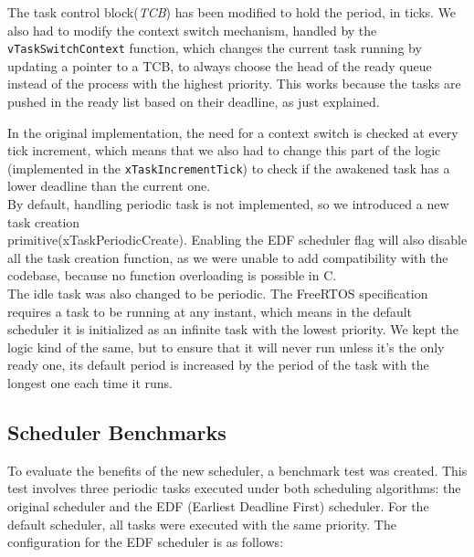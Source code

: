 \documentclass{article}
\begin{document}
The task control block(\textit{TCB}) has been modified to hold the period, in ticks.
We also had to modify the context switch mechanism, handled by the \texttt{vTaskSwitchContext} function, which changes the current task running by updating a pointer to a TCB, to always choose the head of the ready queue instead of the process with the highest priority. This works because the tasks are pushed in the ready list based on their deadline, as just explained.

In the original implementation, the need for a context switch is checked at every tick increment, which means that we also had to change this part of the logic (implemented in the \texttt{xTaskIncrementTick}) to check if the awakened task has a lower deadline than the current one.\\

By default, handling periodic task is not implemented, so we introduced a new task creation \\primitive(xTaskPeriodicCreate). Enabling the EDF scheduler flag will also disable all the task creation function, as we were unable to add compatibility with the codebase, because no function overloading is possible in C.\\

The idle task was also changed to be periodic. The FreeRTOS specification requires a task to be running at any instant, which means in the default scheduler it is initialized as an infinite task with the lowest priority. We kept the logic kind of the same, but to ensure that it will never run unless it's the only ready one, its default period is increased by the period of the task with the longest one each time it runs.
\subsection{Scheduler Benchmarks}
To evaluate the benefits of the new scheduler, a benchmark test was created. This test involves three periodic tasks executed under both scheduling algorithms: the original scheduler and the EDF (Earliest Deadline First) scheduler. For the default scheduler, all tasks were executed with the same priority. The configuration for the EDF scheduler is as follows:
\end{document}
